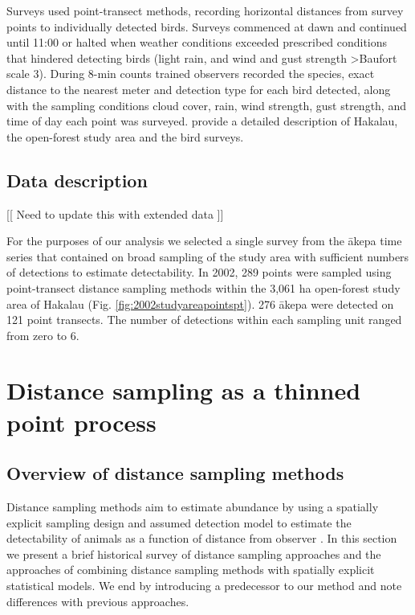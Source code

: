 \documentclass[preprint,12pt]{elsarticle}
\newcommand{\akepa}{\textquotesingle\={a}kepa}  %
\begin{document}
Surveys used point-transect methods, recording horizontal distances from survey points to individually detected birds. Surveys commenced at dawn and continued until 11:00 or halted when weather conditions exceeded prescribed conditions that hindered detecting birds (light rain, and wind and gust strength \textgreater Baufort scale 3). During 8-min counts trained observers recorded the species, exact distance to the nearest meter and detection type for each bird detected, along with the sampling conditions cloud cover, rain, wind strength, gust strength, and time of day each point was surveyed.   \cite{camp_population_2010,camp_statespace_2016} provide a detailed description of Hakalau, the open-forest study area and the bird surveys.

\subsection{Data description}
[[ Need to update this with extended data ]]

For the purposes of our analysis we selected a single survey from the \akepa{} time series that contained on broad sampling of the study area with sufficient numbers of detections to estimate detectability. In 2002, 289 points were sampled using point-transect distance sampling methods within the 3,061 ha open-forest study area of Hakalau (Fig. \ref{fig:2002studyareapointspt}). 276 \akepa{} were detected on 121 point transects. The number of detections within each sampling unit ranged from zero to 6. 


\section{Distance sampling as a thinned point process}

\subsection{Overview of distance sampling methods}

Distance sampling methods aim to estimate abundance by using a spatially explicit sampling design and assumed detection model to estimate the detectability of animals as a function of distance from observer \citep{buckland_advanced_2004, buckland_distance_2015}. In this section we present a brief historical survey of distance sampling approaches and the approaches of combining distance sampling methods with spatially explicit statistical models.  We end by introducing a predecessor to our method and note differences with previous approaches. 
\end{document}
